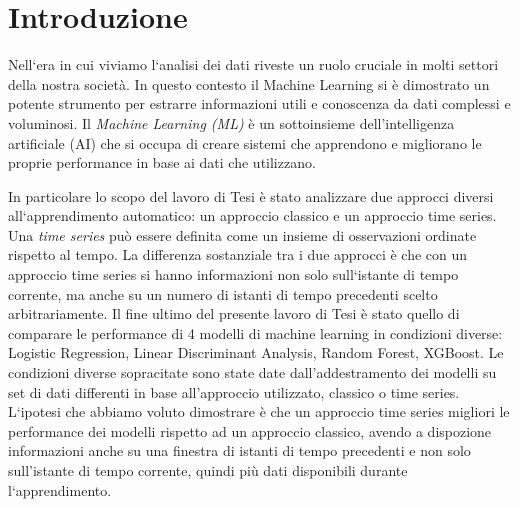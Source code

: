 \chapter{Introduzione}

\medskip

Nell`era in cui viviamo l`analisi dei dati riveste un ruolo cruciale in molti settori della nostra societ\`a.
In questo contesto il Machine Learning si \`e dimostrato un potente strumento per estrarre informazioni utili e conoscenza da dati complessi e voluminosi. 
Il \textit{Machine Learning (ML)} \`e un sottoinsieme dell'intelligenza artificiale (AI) che si occupa di creare sistemi che apprendono e migliorano le proprie performance in base ai dati che utilizzano. 

\begin{comment}
Esistono principalmente due categorie di modelli di apprendimento automatico: machine learning supervisionato e machine learning non supervisionato.
L`apprendimento supervisionato utilizza set di dati etichettati per addestrare gli algoritmi per classificare o prevedere i risultati in modo accurato.
L`apprendimento non supervisionato, utilizza gli algoritmi di machine learning per analizzare e organizzare in cluster i set di dati senza etichette. 
Nel presente lavoro di Tesi sono stati utilizzati dei modelli di machine learning supervisionato, avendo a disposizione dei set di dati etichettati per addestrare gli algoritmi.
\end{comment}

In particolare lo scopo del lavoro di Tesi \`e stato analizzare due approcci diversi all`apprendimento automatico: un approccio classico e un approccio time series. 
Una \textit{time series} \cite{time_series} pu\`o essere definita come un insieme di osservazioni ordinate rispetto al tempo. 
La differenza sostanziale tra i due approcci \`e che con un approccio time series si hanno informazioni non solo sull`istante di tempo corrente, ma anche su un numero di istanti di tempo precedenti scelto arbitrariamente.
Il fine ultimo del presente lavoro di Tesi \`e stato quello di comparare le performance di 4 modelli di machine learning in condizioni diverse: Logistic Regression, Linear Discriminant Analysis, Random Forest, XGBoost.
Le condizioni diverse sopracitate sono state date dall'addestramento dei modelli su set di dati differenti in base all'approccio utilizzato, classico o time series.
L`ipotesi che abbiamo voluto dimostrare \`e che un approccio time series migliori le performance dei modelli rispetto ad un approccio classico, avendo a dispozione informazioni anche su una finestra di istanti di tempo precedenti e non solo sull'istante di tempo corrente, quindi pi\`u dati disponibili durante l`apprendimento.

